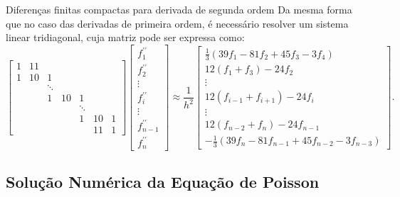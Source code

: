 \begin{frame}{Diferenças finitas compactas para derivada de segunda ordem}
Da mesma forma que no caso das derivadas de primeira ordem, é necessário resolver um sistema linear tridiagonal, cuja matriz pode ser expressa como:
\begin{equation}
\left[\begin{array}{ccccccc}
1 & 11 & & & & & \\
1 & 10 & 1 & & & & \\
& & \ddots & & & & \\
& & 1 & 10 & 1 & & \\
& & & & \ddots & & \\
& & & & 1 & 10 & 1 \\
& & & & & 11 & 1
\end{array}\right]\left[\begin{array}{c}
f_1^{\prime \prime} \\
f_2^{\prime \prime} \\
\vdots \\
f_i^{\prime \prime} \\
\vdots \\
f_{n-1}^{\prime \prime} \\
f_n^{\prime \prime}
\end{array}\right] \approx \frac{1}{h^2}\left[\begin{array}{c}\frac{1}{3}\left(39f_1 - 81f_2 + 45f_3 - 3f_4\right) \\ 12\left(f_1 + f_3\right) -24f_2 \\ \vdots \\ 12\left(f_{i-1} + f_{i+1}\right) -24f_{i} \\ \vdots \\ 12\left(f_{n-2} + f_{n}\right) -24f_{n-1}  \\ -\frac{1}{3}\left(39f_{n} - 81f_{n-1} + 45f_{n-2} - 3f_{n-3}\right)\end{array}\right].
\end{equation}
\end{frame}

\subsection{Solução Numérica da Equação de Poisson}

